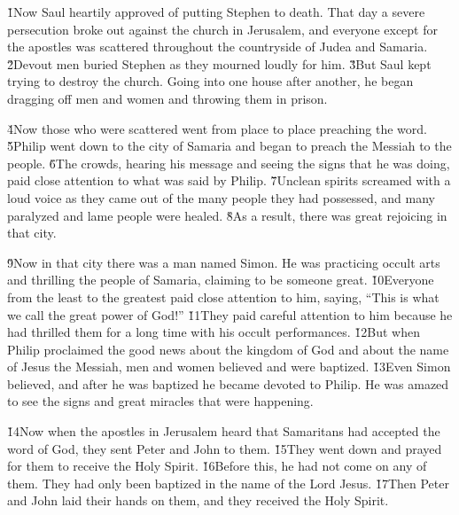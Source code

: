 \v{1}Now Saul heartily approved of putting Stephen to death. That day a severe persecution broke out against the church in Jerusalem, and everyone except for the apostles was scattered throughout the countryside of Judea and Samaria. \v{2}Devout men buried Stephen as they mourned loudly for him. \v{3}But Saul kept trying to destroy the church. Going into one house after another, he began dragging off men and women and throwing them in prison.

\v{4}Now those who were scattered went from place to place preaching the word. \v{5}Philip went down to the city of Samaria and began to preach the Messiah to the people. \v{6}The crowds, hearing his message and seeing the signs that he was doing, paid close attention to what was said by Philip. \v{7}Unclean spirits screamed with a loud voice as they came out of the many people they had possessed, and many paralyzed and lame people were healed. \v{8}As a result, there was great rejoicing in that city.

\v{9}Now in that city there was a man named Simon. He was practicing occult arts and thrilling the people of Samaria, claiming to be someone great. \v{10}Everyone from the least to the greatest paid close attention to him, saying, ``This is what we call the great power of God!'' \v{11}They paid careful attention to him because he had thrilled them for a long time with his occult performances. \v{12}But when Philip proclaimed the good news about the kingdom of God and about the name of Jesus the Messiah, men and women believed and were baptized. \v{13}Even Simon believed, and after he was baptized he became devoted to Philip. He was amazed to see the signs and great miracles that were happening.

\v{14}Now when the apostles in Jerusalem heard that Samaritans had accepted the word of God, they sent Peter and John to them. \v{15}They went down and prayed for them to receive the Holy Spirit. \v{16}Before this, he had not come on any of them. They had only been baptized in the name of the Lord Jesus. \v{17}Then Peter and John laid their hands on them, and they received the Holy Spirit.


